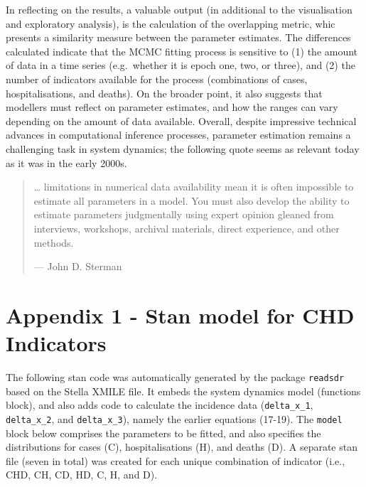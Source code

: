 \documentclass[10pt,letterpaper]{article}
\begin{document}
In reflecting on the results, a valuable output (in additional to the visualisation and exploratory analysis), is the calculation of the overlapping metric, whic presents a similarity measure between the parameter estimates. The differences calculated indicate that the MCMC fitting process is sensitive to (1) the amount of data in a time series (e.g.~whether it is epoch one, two, or three), and (2) the number of indicators available for the process (combinations of cases, hospitalisations, and deaths). On the broader point, it also suggests that modellers must reflect on parameter estimates, and how the ranges can vary depending on the amount of data available. Overall, despite impressive technical advances in computational inference processes, parameter estimation remains a challenging task in system dynamics; the following quote seems as relevant today as it was in the early 2000s.

\begin{quote}
\ldots{} limitations in numerical data availability mean it is often impossible to estimate all parameters in a model.
You must also develop the ability to estimate parameters judgmentally using expert opinion gleaned from
interviews, workshops, archival materials, direct experience, and other methods.

--- John D. Sterman \citep{StermanBook}
\end{quote}

\newpage

\hypertarget{appendix-1---stan-model-for-chd-indicators}{%
\section{Appendix 1 - Stan model for CHD Indicators}\label{appendix-1---stan-model-for-chd-indicators}}

The following stan code was automatically generated by the package \texttt{readsdr} \citep{andrade_readsdr} based on the Stella XMILE file. It embeds the system dynamics model (functions block), and also adds code to calculate the incidence data (\texttt{delta\_x\_1}, \texttt{delta\_x\_2}, and \texttt{delta\_x\_3}), namely the earlier equations (17-19). The \texttt{model} block below comprises the parameters to be fitted, and also specifies the distributions for cases (C), hospitalisations (H), and deaths (D). A separate stan file (seven in total) was created for each unique combination of indicator (i.e., CHD, CH, CD, HD, C, H, and D).
\end{document}
